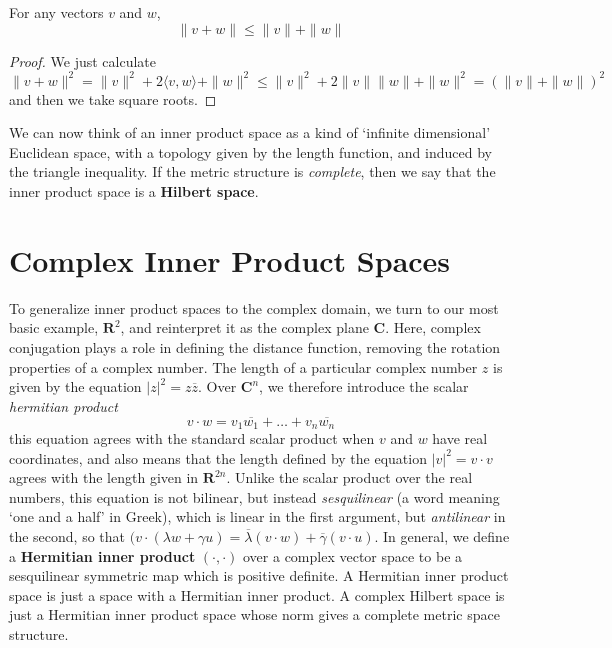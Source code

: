\begin{theorem}
    For any vectors $v$ and $w$,
    \[ \| v + w \| \leq \|v\| + \|w\| \]
\end{theorem}
\begin{proof}
    We just calculate
    \[ \| v + w \|^2 = \| v \|^2 + 2 \langle v, w \rangle + \| w \|^2 \leq \| v \|^2 + 2 \|v\| \|w\| + \|w\|^2 = \left(\|v \| + \|w\| \right)^2 \]
    and then we take square roots.
\end{proof}

We can now think of an inner product space as a kind of `infinite dimensional' Euclidean space, with a topology given by the length function, and induced by the triangle inequality. If the metric structure is {\it complete}, then we say that the inner product space is a {\bf Hilbert space}.

\section{Complex Inner Product Spaces}

To generalize inner product spaces to the complex domain, we turn to our most basic example, $\mathbf{R}^2$, and reinterpret it as the complex plane $\mathbf{C}$. Here, complex conjugation plays a role in defining the distance function, removing the rotation properties of a complex number. The length of a particular complex number $z$ is given by the equation $|z|^2 = z \overline{z}$. Over $\mathbf{C}^n$, we therefore introduce the scalar {\it hermitian product}
%
\[ v \cdot w = v_1 \overline{w_1} + \dots + v_n \overline{w_n} \]
%
this equation agrees with the standard scalar product when $v$ and $w$ have real coordinates, and also means that the length defined by the equation $|v|^2 = v \cdot v$ agrees with the length given in $\mathbf{R}^{2n}$. Unlike the scalar product over the real numbers, this equation is not bilinear, but instead {\it sesquilinear} (a word meaning `one and a half' in Greek), which is linear in the first argument, but {\it antilinear} in the second, so that $(v \cdot (\lambda w + \gamma u) = \overline{\lambda} (v \cdot w) + \overline{\gamma} (v \cdot u)$. In general, we define a {\bf Hermitian inner product} $(\cdot, \cdot)$ over a complex vector space to be a sesquilinear symmetric map which is positive definite. A Hermitian inner product space is just a space with a Hermitian inner product. A complex Hilbert space is just a Hermitian inner product space whose norm gives a complete metric space structure.


